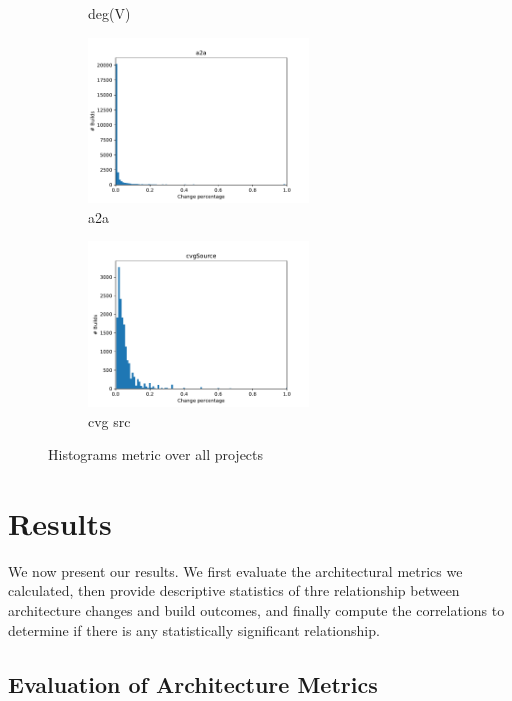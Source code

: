 \documentclass[sigconf, anonymous, review]{acmart}
\begin{document}
\begin{figure}[!t]
\begin{subfigure}{2.3in}
		\caption{deg(V)}
		\label{nodDegHist}
	\end{subfigure}%
	\begin{subfigure}{2.3in}
		\centering
		\includegraphics[width=2.3in]{assets/a2a.pdf}
		\caption{a2a}
		\label{a2aHist}
	\end{subfigure}%
	\begin{subfigure}{2.3in}
		\centering
		\includegraphics[width=2.3in]{assets/cvgSource.pdf}
		\caption{cvg src}
		\label{cvgHist}
	\end{subfigure}
	\caption{Histograms metric over all projects}
	\label{fig:histograms}
	
\end{figure}

\section{Results}

We now present our results. We first evaluate the architectural metrics we calculated, then provide descriptive statistics of thre relationship between architecture changes and build outcomes, and finally compute the correlations to determine if there is any statistically significant relationship.

\subsection{Evaluation of Architecture Metrics}


\end{document}
